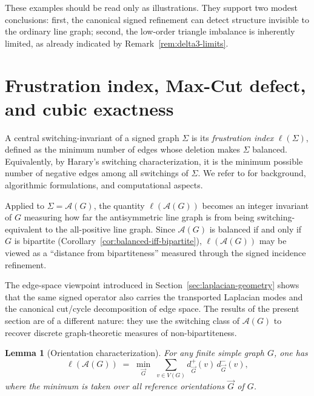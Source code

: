 \documentclass[11pt]{article}
\newtheorem{lemma}{Lemma}
\theoremstyle{plain}
\begin{document}
These examples should be read only as illustrations.
They support two modest conclusions: first, the canonical signed refinement can
detect structure invisible to the ordinary line graph; second, the low-order
triangle imbalance is inherently limited, as already indicated by
Remark~\ref{rem:delta3-limits}.

\section{Frustration index, Max-Cut defect, and cubic exactness}\label{sec:frustration-maxcut}

A central switching-invariant of a signed graph $\Sigma$ is its \emph{frustration index}
$\ell(\Sigma)$, defined as the minimum number of edges whose deletion makes $\Sigma$
balanced. Equivalently, by Harary's switching characterization, it is the minimum possible
number of negative edges among all switchings of $\Sigma$.
We refer to \cite{Zaslavsky1982,ArefMasonWilson2016,ArefWilson2020} for background, algorithmic
formulations, and computational aspects.

Applied to $\Sigma=\mathcal A(G)$, the quantity $\ell(\mathcal A(G))$ becomes an integer invariant of $G$ measuring how far the antisymmetric line graph is from being switching-equivalent to the all-positive line graph. Since $\mathcal A(G)$ is balanced if and only if $G$ is bipartite (Corollary~\ref{cor:balanced-iff-bipartite}), $\ell(\mathcal A(G))$ may be viewed as a ``distance from bipartiteness'' measured through the signed incidence refinement.

The edge-space viewpoint introduced in Section~\ref{sec:laplacian-geometry}
shows that the same signed operator also carries the transported Laplacian modes
and the canonical cut/cycle decomposition of edge space.
The results of the present section are of a different nature: they use the
switching class of $\mathcal A(G)$ to recover discrete graph-theoretic measures
of non-bipartiteness.

\medskip

\begin{lemma}[Orientation characterization]\label{lem:orientation-frustration}
For any finite simple graph $G$, one has
\[
\ell(\mathcal A(G)) \;=\; \min_{\vec{G}} \;\sum_{v\in V(G)} d^+_{\vec G}(v)\,d^-_{\vec G}(v),
\]
where the minimum is taken over all reference orientations $\vec G$ of $G$.
\end{lemma}
\end{document}
